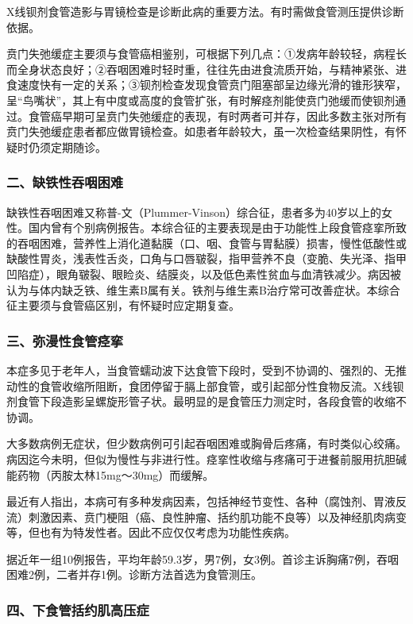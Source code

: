 X线钡剂食管造影与胃镜检查是诊断此病的重要方法。有时需做食管测压提供诊断依据。

贲门失弛缓症主要须与食管癌相鉴别，可根据下列几点：①发病年龄较轻，病程长而全身状态良好；②吞咽困难时轻时重，往往先由进食流质开始，与精神紧张、进食速度快有一定的关系；③钡剂检查发现食管贲门阻塞部呈边缘光滑的锥形狭窄，呈“鸟嘴状”，其上有中度或高度的食管扩张，有时解痉剂能使贲门弛缓而使钡剂通过。食管癌早期可呈贲门失弛缓症的表现，有时两者可并存，因此多数主张对所有贲门失弛缓症患者都应做胃镜检查。如患者年龄较大，虽一次检查结果阴性，有怀疑时仍须定期随诊。

\subsubsection{二、缺铁性吞咽困难}

缺铁性吞咽困难又称普-文（Plummer-Vinson）综合征，患者多为40岁以上的女性。国内曾有个别病例报告。本综合征的主要表现是由于功能性上段食管痉挛所致的吞咽困难，营养性上消化道黏膜（口、咽、食管与胃黏膜）损害，慢性低酸性或缺酸性胃炎，浅表性舌炎，口角与口唇皲裂，指甲营养不良（变脆、失光泽、指甲凹陷症），眼角皲裂、眼睑炎、结膜炎，以及低色素性贫血与血清铁减少。病因被认为与体内缺乏铁、维生素B属有关。铁剂与维生素B治疗常可改善症状。本综合征主要须与食管癌区别，有怀疑时应定期复查。

\subsubsection{三、弥漫性食管痉挛}

本症多见于老年人，当食管蠕动波下达食管下段时，受到不协调的、强烈的、无推动性的食管收缩所阻断，食团停留于膈上部食管，或引起部分性食物反流。X线钡剂食管下段造影呈螺旋形管子状。最明显的是食管压力测定时，各段食管的收缩不协调。

大多数病例无症状，但少数病例可引起吞咽困难或胸骨后疼痛，有时类似心绞痛。病因迄今未明，但似为慢性与非进行性。痉挛性收缩与疼痛可于进餐前服用抗胆碱能药物（丙胺太林15mg～30mg）而缓解。

最近有人指出，本病可有多种发病因素，包括神经节变性、各种（腐蚀剂、胃液反流）刺激因素、贲门梗阻（癌、良性肿瘤、括约肌功能不良等）以及神经肌肉病变等，但也有为特发性者。因此不应仅仅考虑为功能性疾病。

据近年一组10例报告，平均年龄59.3岁，男7例，女3例。首诊主诉胸痛7例，吞咽困难2例，二者并存1例。诊断方法首选为食管测压。

\subsubsection{四、下食管括约肌高压症}

